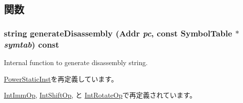 \subsection{関数}
\hypertarget{classPowerISA_1_1IntOp_a3134956ec18bb095818e06eb988f6c55}{
\subsubsection[{generateDisassembly}]{\setlength{\rightskip}{0pt plus 5cm}string generateDisassembly ({\bf Addr} {\em pc}, \/  const SymbolTable $\ast$ {\em symtab}) const}}
\label{classPowerISA_1_1IntOp_a3134956ec18bb095818e06eb988f6c55}
Internal function to generate disassembly string. 

\hyperlink{classPowerISA_1_1PowerStaticInst_a95d323a22a5f07e14d6b4c9385a91896}{PowerStaticInst}を再定義しています。

\hyperlink{classPowerISA_1_1IntImmOp_a3134956ec18bb095818e06eb988f6c55}{IntImmOp}, \hyperlink{classPowerISA_1_1IntShiftOp_a3134956ec18bb095818e06eb988f6c55}{IntShiftOp}, と \hyperlink{classPowerISA_1_1IntRotateOp_a3134956ec18bb095818e06eb988f6c55}{IntRotateOp}で再定義されています。


